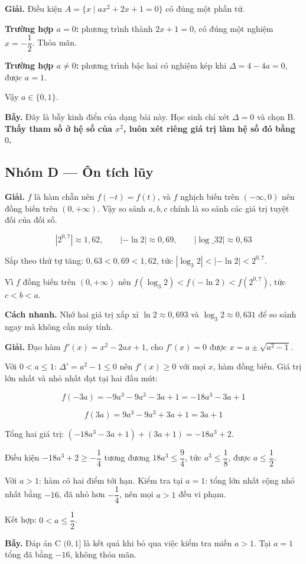 \documentclass[11pt, a4paper]{article}
\begin{document}
\begin{dapan}[25 — Đáp án C]
\textbf{Giải.} Điều kiện $A = \{x \mid ax^2 + 2x + 1 = 0\}$ có đúng một phần tử.

\textbf{Trường hợp $a = 0$:} phương trình thành $2x + 1 = 0$, có đúng một nghiệm $x = -\dfrac{1}{2}$. Thỏa mãn.

\textbf{Trường hợp $a \neq 0$:} phương trình bậc hai có nghiệm kép khi $\Delta = 4 - 4a = 0$, được $a = 1$.

Vậy $a \in \{0, 1\}$.

\textbf{Bẫy.} Đây là bẫy kinh điển của dạng bài này. Học sinh chỉ xét $\Delta = 0$ và chọn B. \textbf{Thấy tham số ở hệ số của $x^2$, luôn xét riêng giá trị làm hệ số đó bằng $0$.}
\end{dapan}

\subsection*{Nhóm D — Ôn tích lũy}

\begin{dapan}[1 — Đáp án B]
\textbf{Giải.} $f$ là hàm chẵn nên $f(-t) = f(t)$, và $f$ nghịch biến trên $(-\infty, 0)$ nên đồng biến trên $(0, +\infty)$. Vậy so sánh $a, b, c$ chính là so sánh các giá trị tuyệt đối của đối số.

$$\left|2^{0{,}7}\right| \approx 1{,}62, \qquad |-\ln 2| \approx 0{,}69, \qquad |\log\_3 2| \approx 0{,}63$$

Sắp theo thứ tự tăng: $0{,}63 < 0{,}69 < 1{,}62$, tức $|\log_3 2| < |-\ln 2| < 2^{0{,}7}$.

Vì $f$ đồng biến trên $(0, +\infty)$ nên $f(\log_3 2) < f(-\ln 2) < f(2^{0{,}7})$, tức $c < b < a$.

\textbf{Cách nhanh.} Nhớ hai giá trị xấp xỉ $\ln 2 \approx 0{,}693$ và $\log_3 2 \approx 0{,}631$ để so sánh ngay mà không cần máy tính.
\end{dapan}

\begin{dapan}[2 — Đáp án B]
\textbf{Giải.} Đạo hàm $f'(x) = x^2 - 2ax + 1$, cho $f'(x) = 0$ được $x = a \pm \sqrt{a^2 - 1}$.

Với $0 < a \le 1$: $\Delta' = a^2 - 1 \le 0$ nên $f'(x) \ge 0$ với mọi $x$, hàm đồng biến. Giá trị lớn nhất và nhỏ nhất đạt tại hai đầu mút:

$$f(-3a) = -9a^3 - 9a^3 - 3a + 1 = -18a^3 - 3a + 1$$

$$f(3a) = 9a^3 - 9a^3 + 3a + 1 = 3a + 1$$

Tổng hai giá trị: $(-18a^3 - 3a + 1) + (3a + 1) = -18a^3 + 2$.

Điều kiện $-18a^3 + 2 \ge -\dfrac{1}{4}$ tương đương $18a^3 \le \dfrac{9}{4}$, tức $a^3 \le \dfrac{1}{8}$, được $a \le \dfrac{1}{2}$.

Với $a > 1$: hàm có hai điểm tới hạn. Kiểm tra tại $a = 1$: tổng lớn nhất cộng nhỏ nhất bằng $-16$, đã nhỏ hơn $-\dfrac{1}{4}$, nên mọi $a > 1$ đều vi phạm.

Kết hợp: $0 < a \le \dfrac{1}{2}$.

\textbf{Bẫy.} Đáp án C $(0,1]$ là kết quả khi bỏ qua việc kiểm tra miền $a > 1$. Tại $a = 1$ tổng đã bằng $-16$, không thỏa mãn.
\end{dapan}
\end{document}

